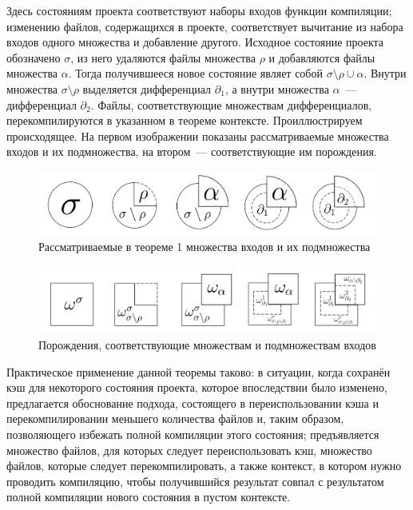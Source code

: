 Здесь состояниям проекта соответствуют наборы входов функции компиляции; изменению файлов, содержащихся в проекте, соответствует вычитание из набора входов одного множества и добавление другого. Исходное состояние проекта обозначено $\sigma$, из него удаляются файлы множества $\rho$ и добавляются файлы множества $\alpha$. Тогда получившееся новое состояние являет собой $\sigma\setminus\rho\cup\alpha$. Внутри множества $\sigma\setminus\rho$ выделяется дифференциал $\partial_1$, а внутри множества $\alpha$~--- дифференциал $\partial_2$. Файлы, соответствующие множествам дифференциалов, перекомпилируются в указанном в теореме контексте. Проиллюстрируем происходящее. На первом изображении показаны рассматриваемые множества входов и их подмножества, на втором~--- соответствующие им порождения.

\begin{figure}[h]
	\centering
	\includegraphics[width=160mm]{theorem1_src.png}
	\caption{Рассматриваемые в теореме 1 множества входов и их подмножества}
	\label{fig:theorem1_src}
\end{figure}

\begin{figure}[h]
	\centering
	\includegraphics[width=160mm]{theorem1_dst.png}
	\caption{Порождения, соответствующие множествам и подмножествам входов}
	\label{fig:theorem1_dst}
\end{figure}

Практическое применение данной теоремы таково: в ситуации, когда сохранён кэш для некоторого состояния проекта, которое впоследствии было изменено, предлагается обоснование подхода, состоящего в переиспользовании кэша и перекомпилировании меньшего количества файлов и, таким образом, позволяющего избежать полной компиляции этого состояния; предъявляется множество файлов, для которых следует переиспользовать кэш, множество файлов, которые следует перекомпилировать, а также контекст, в котором нужно проводить компиляцию, чтобы получившийся результат совпал с результатом полной компиляции нового состояния в пустом контексте.

